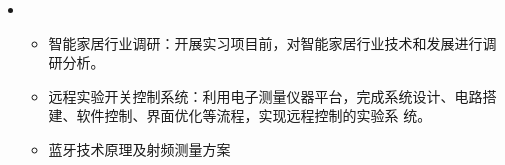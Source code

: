   \begin{itemize}[leftmargin=*]
    \item
      {\small
      \begin{itemize}
        \item 智能家居行业调研：开展实习项目前，对智能家居行业技术和发展进行调研分析。
        \item 远程实验开关控制系统：利用电子测量仪器平台，完成系统设计、电路搭建、软件控制、界面优化等流程，实现远程控制的实验系
        统。
        \item 蓝牙技术原理及射频测量方案
      \end{itemize}
      }
  \end{itemize}